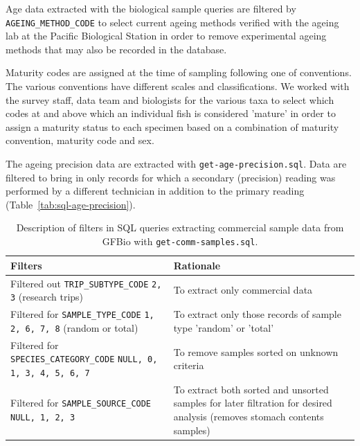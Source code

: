 \documentclass[11pt]{book}\usepackage[]{graphicx}\usepackage[]{color}
\begin{document}
Age data extracted with the biological sample queries are filtered by
\texttt{AGEING\_METHOD\_CODE} to select current ageing methods verified with the
ageing lab at the Pacific Biological Station in order to remove experimental
ageing methods that may also be recorded in the database.

Maturity codes are assigned at the time of sampling following one of
conventions. The various conventions have different scales and classifications.
We worked with the survey staff, data team and biologists for the various taxa
to select which codes at and above which an individual fish is considered
'mature' in order to assign a maturity status to each specimen based on a
combination of maturity convention, maturity code and sex.

The ageing precision data are extracted with \texttt{get-age-precision.sql}.
Data are filtered to bring in only records for which a secondary (precision)
reading was performed by a different technician in addition to the primary
reading (Table~\ref{tab:sql-age-precision}).

\clearpage

\begin{table}[htpb]
\centering
\caption{Description of filters in SQL queries extracting commercial sample data from GFBio with \texttt{get-comm-samples.sql}.}
\label{tab:sql-comm-samp}
{\tabulinesep=1.6mm
\begin{tabu}{>{\raggedright\arraybackslash}m{2.8in}>{\raggedright\arraybackslash}m{3.2in}}
\toprule
Filters                                                                                       & Rationale                                                                                                                                 \\
\midrule
Filtered out \texttt{TRIP\_SUBTYPE\_CODE} \texttt{2, 3} (research trips)                      & To extract only commercial data                                                                                                           \\
Filtered for \texttt{SAMPLE\_TYPE\_CODE} \texttt{1, 2, 6, 7, 8} (random or total)             & To extract only those records of sample type 'random' or 'total'                                                                          \\
Filtered for \texttt{SPECIES\_CATEGORY\_CODE} \texttt{NULL, 0, 1, 3, 4, 5, 6, 7}              & To remove samples sorted on unknown criteria                                                                                              \\
Filtered for \texttt{SAMPLE\_SOURCE\_CODE} \texttt{NULL, 1, 2, 3}                             & To extract both sorted and unsorted samples for later filtration for desired analysis (removes stomach contents samples)                  \\
\bottomrule
\end{tabu}}
\end{table}
\end{document}
